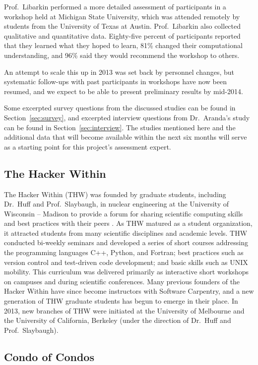 \documentclass{proposalnsf}
\newlength{\up}
\begin{document}
Prof.\ Libarkin performed a more detailed assessment of participants
in a workshop held at Michigan State University, which was attended
remotely by students from the University of Texas at Austin.
Prof.\ Libarkin also collected qualitative and quantitative
data. Eighty-five percent of participants reported that they learned
what they hoped to learn, 81\% changed their computational
understanding, and 96\% said they would recommend the workshop to
others.

An attempt to scale this up in 2013 was set back by personnel changes,
but systematic follow-ups with past participants in workshops have now
been resumed, and we expect to be able to present preliminary results
by mid-2014.

Some excerpted survey questions from the discussed studies can be
found in Section~\ref{sec:survey}, and excerpted interview questions
from Dr.\ Aranda's study can be found in Section~\ref{sec:interview}.
The studies mentioned here and the additional data that will become
available within the next six months will serve as a starting point
for this project's assessment expert.

\subsection{The Hacker Within}
\label{sec:THW}

The Hacker Within (THW) was founded by graduate students, including
Dr.\ Huff and Prof.\ Slaybaugh, in nuclear engineering at the
University of Wisconsin -- Madison to provide a forum for sharing
scientific computing skills and best practices with their peers
\cite{huff2011}. As THW matured as a student organization, it
attracted students from many scientific disciplines and academic
levels. THW conducted bi-weekly seminars and developed a series of
short courses addressing the programming languages C++, Python, and
Fortran; best practices such as version control and test-driven code
development; and basic skills such as UNIX mobility. This curriculum
was delivered primarily as interactive short workshops on campuses and
during scientific conferences. Many previous founders of the Hacker
Within have since become instructors with Software Carpentry, and a
new generation of THW graduate students has begun to emerge in their
place. In 2013, new branches of THW were initiated at the University
of Melbourne and the University of California, Berkeley (under the
direction of Dr.\ Huff and Prof.\ Slaybaugh).

\subsection{Condo of Condos}
\label{sec:CofC}
\end{document}
